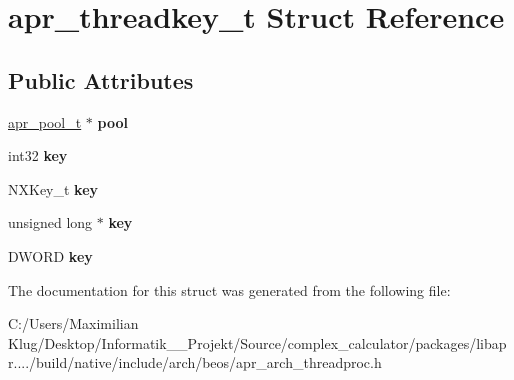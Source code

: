 \hypertarget{structapr__threadkey__t}{}\section{apr\+\_\+threadkey\+\_\+t Struct Reference}
\label{structapr__threadkey__t}
\subsection*{Public Attributes}
\begin{DoxyCompactItemize}
\item 
\mbox{\label{structapr__threadkey__t_a400200f84ec2f8a160beaa933b6a8b2a}} 
\mbox{\hyperlink{group__apr__pools_gaf137f28edcf9a086cd6bc36c20d7cdfb}{apr\+\_\+pool\+\_\+t}} $\ast$ {\bfseries pool}
\item 
\mbox{\label{structapr__threadkey__t_af64a505d11a973d13a331f9cd3033e8c}} 
int32 {\bfseries key}
\item 
\mbox{\label{structapr__threadkey__t_af3099d0fc83e89daea2979a2760f43f3}} 
N\+X\+Key\+\_\+t {\bfseries key}
\item 
\mbox{\label{structapr__threadkey__t_a40bc8a208b8ca674446884ecc4d89a23}} 
unsigned long $\ast$ {\bfseries key}
\item 
\mbox{\label{structapr__threadkey__t_a4c015e5602825b30c3fc35950fdbf41b}} 
D\+W\+O\+RD {\bfseries key}
\end{DoxyCompactItemize}


The documentation for this struct was generated from the following file\+:\begin{DoxyCompactItemize}
\item 
C\+:/\+Users/\+Maximilian Klug/\+Desktop/\+Informatik\+\_\+\_\+\+Projekt/\+Source/complex\+\_\+calculator/packages/libapr..../build/native/include/arch/beos/apr\+\_\+arch\+\_\+threadproc.\+h\end{DoxyCompactItemize}
